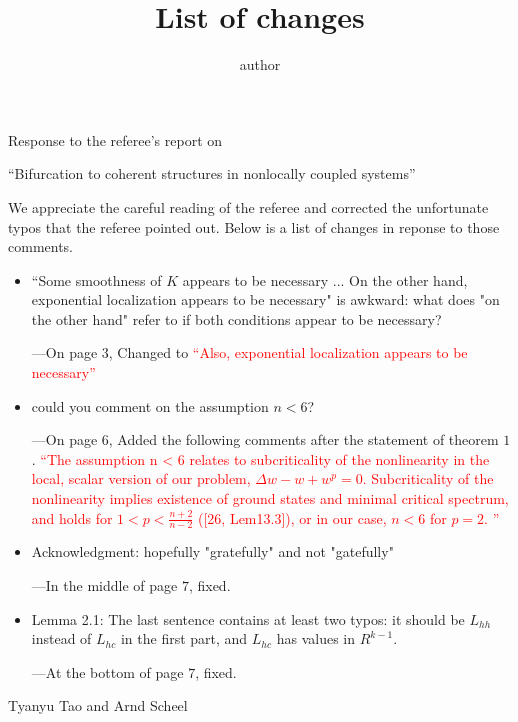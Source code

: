\documentclass[letterpaper,11pt]{article}
\title{List of changes}
\author{author}
\numberwithin{equation}{section}
\theoremstyle{plain}
\begin{document}
Response to the referee's report on 

``Bifurcation to coherent structures in nonlocally coupled systems''

We appreciate the careful reading of the referee and corrected the unfortunate typos that the referee pointed out. Below is a list of changes in reponse to those comments.

\begin{itemize}

\item ``Some smoothness of $K$ appears to be necessary ... On the other hand, exponential localization appears to be necessary" is awkward: what does "on the other hand" refer to if both conditions appear to be necessary?

---On page $3$, Changed to \textcolor{red}{``Also,  exponential localization appears to be necessary''} 

\item could you comment on the assumption $n<6$?

---On page $6$, Added the following comments after the statement of theorem $1$. \textcolor{red} { ``The assumption n < 6 relates to subcriticality of the nonlinearity in the local, scalar version of our problem,
 $\Delta w- w + w^p = 0$. Subcriticality of the nonlinearity implies existence of ground states and minimal critical spectrum, and  holds for $1 < p < \frac{n+2}{n-2}$
 ([26, Lem13.3]), or in our case, $n<6$ for $p=2$. ''}

\item Acknowledgment: hopefully "gratefully" and not "gatefully"

---In the middle of page $7$, fixed.

\item Lemma 2.1: The last sentence contains at least two typos: it should be $L_{hh}$ instead of $L_{hc}$ in the first part, and $L_{hc}$ has values in $R^{k-1}$.

---At the bottom of page $7$, fixed.
\end{itemize}


Tyanyu Tao and Arnd Scheel
\end{document}
